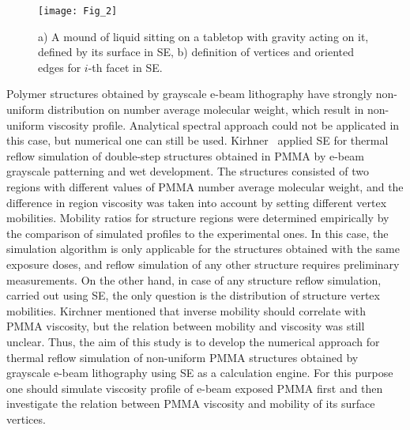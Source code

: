 \begin{figure}[t]
	\centering
	\texttt{[image: Fig\_2]} \\
	\caption{a) A mound of liquid sitting on a tabletop with gravity acting on it, defined by its surface in SE, b) definition of vertices and oriented edges for $i$-th facet in SE.}
	\label{fig:SE_basic}
\end{figure}

Polymer structures obtained by grayscale e-beam lithography have strongly non-uniform distribution on number average molecular weight, which result in non-uniform viscosity profile.
Analytical spectral approach could not be applicated in this case, but numerical one can still be used.
Kirhner~\cite{Kirchner_SE_1} applied SE for thermal reflow simulation of double-step structures obtained in PMMA by e-beam grayscale patterning and wet development.
The structures consisted of two regions with different values of PMMA number average molecular weight, and the difference in region viscosity was taken into account by setting different vertex mobilities.
Mobility ratios for structure regions were determined empirically by the comparison of simulated profiles to the experimental ones.
In this case, the simulation algorithm is only applicable for the structures obtained with the same exposure doses, and reflow simulation of any other structure requires preliminary measurements.
On the other hand, in case of any structure reflow simulation, carried out using SE, the only question is the distribution of structure vertex mobilities.
Kirchner mentioned that inverse mobility should correlate with PMMA viscosity, but the relation between mobility and viscosity was still unclear.
Thus, the aim of this study is to develop the numerical approach for thermal reflow simulation of non-uniform PMMA structures obtained by grayscale e-beam lithography using SE as a calculation engine.
For this purpose one should simulate viscosity profile of e-beam exposed PMMA first and then
investigate the relation between PMMA viscosity and mobility of its surface vertices.
